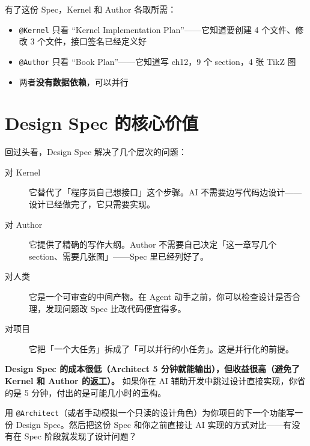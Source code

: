 有了这份 Spec，Kernel 和 Author 各取所需：

\begin{itemize}
  \item \texttt{@Kernel} 只看 ``Kernel Implementation Plan''——它知道要创建 4 个文件、修改 3 个文件，接口签名已经定义好
  \item \texttt{@Author} 只看 ``Book Plan''——它知道写 ch12，9 个 section，4 张 TikZ 图
  \item 两者\textbf{没有数据依赖}，可以并行
\end{itemize}

\section{Design Spec 的核心价值}

回过头看，Design Spec 解决了几个层次的问题：

\begin{description}
  \item[对 Kernel] 它替代了「程序员自己想接口」这个步骤。AI 不需要边写代码边设计——设计已经做完了，它只需要实现。
  \item[对 Author] 它提供了精确的写作大纲。Author 不需要自己决定「这一章写几个 section、需要几张图」——Spec 里已经列好了。
  \item[对人类] 它是一个可审查的中间产物。在 Agent 动手之前，你可以检查设计是否合理，发现问题改 Spec 比改代码便宜得多。
  \item[对项目] 它把「一个大任务」拆成了「可以并行的小任务」。这是并行化的前提。
\end{description}

\begin{lessonbox}
\textbf{Design Spec 的成本很低（Architect 5 分钟就能输出），但收益很高（避免了 Kernel 和 Author 的返工）。} 如果你在 AI 辅助开发中跳过设计直接实现，你省的是 5 分钟，付出的是可能几小时的重构。
\end{lessonbox}

\begin{exercise}
用 \texttt{@Architect}（或者手动模拟一个只读的设计角色）为你项目的下一个功能写一份 Design Spec。然后把这份 Spec 和你之前直接让 AI 实现的方式对比——有没有在 Spec 阶段就发现了设计问题？
\end{exercise}

